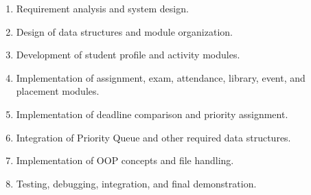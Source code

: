 \documentclass[11pt,a4paper]{article}
\newenvironment{sectionblock}
{%
    \par
    \needspace{8\baselineskip}
}
{%
    \par
}
\begin{document}
\begin{sectionblock}
{\begin{enumerate}

    \item Requirement analysis and system design.

    \item Design of data structures and module organization.

    \item Development of student profile and activity modules.

    \item Implementation of assignment, exam, attendance, library, event, and placement modules.

    \item Implementation of deadline comparison and priority assignment.

    \item Integration of Priority Queue and other required data structures.

    \item Implementation of OOP concepts and file handling.

    \item Testing, debugging, integration, and final demonstration.

\end{enumerate}

}

\end{sectionblock}

\newpage

\end{document}

